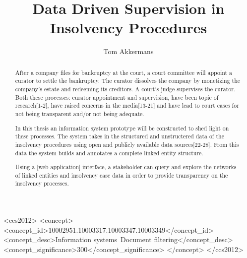 \documentclass[sigconf]{acmart}
\begin{document}

\pagebreak
\title{Data Driven Supervision in Insolvency Procedures}

\author{Tom Akkermans}


\begin{abstract}
After a company files for bankruptcy at the court, a court committee will appoint a curator to settle the bankruptcy. The curator dissolves the company by monetizing the company's estate and redeeming its creditors. A court’s judge supervises the curator. Both these processes: curator appointment and supervision, have been topic of research[1-2], have raised concerns in the media[13-21] and have lead to court cases for not being transparent and/or not being adequate.

In this thesis an information system prototype will be constructed to shed light on these processes. The system takes in the structured and unstructered data of the insolvency procedures using open and publicly available data sources[22-28]. From this data the system builds and annotates a complete linked entity structure.

Using a [web application] interface, a stakeholder can query and explore the networks of linked entities and insolvency case data in order to provide transparency on the insolvency processes.
\end{abstract}

%
%
\begin{CCSXML}
<ccs2012>
	<concept>
		<concept_id>10002951.10003317.10003347.10003349</concept_id>
		<concept_desc>Information systems~Document filtering</concept_desc>
		<concept_significance>300</concept_significance>
	</concept>
</ccs2012>
\end{CCSXML}


\maketitle




%
\end{document}
